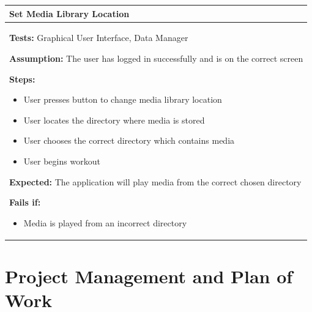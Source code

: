 \documentclass[letterpaper,english, 12pt]{scrreprt}
\begin{document}
\begin{center}
        \begin{tabular}{|C{15cm}|}
                \hline
                        \textbf{Set Media Library Location}\\
                \hline
                        \begin{flushleft}
                                \textbf{Tests: } Graphical User Interface, Data Manager
                        \end{flushleft}
                        \begin{flushleft}
                                \textbf{Assumption: } The user has logged in successfully and is on the correct screen
                        \end{flushleft}
                        \begin{flushleft}
                                \textbf{Steps:}
                        \end{flushleft}
				\begin{itemize}
					\item User presses button to change media library location
					\item User locates the directory where media is stored
					\item User chooses the correct directory which contains media
					\item User begins workout
				\end{itemize}
			\begin{flushleft}
				\textbf{Expected: } The application will play media from the correct chosen directory
			\end{flushleft}
                        \begin{flushleft}
                                \textbf{Fails if: }
                        \end{flushleft}
                                \begin{itemize}
                                        \item Media is played from an incorrect directory
                                \end{itemize}
				\\
		\hline
        \end{tabular}
\end{center}

\chapter{Project Management and Plan of Work}
\end{document}
